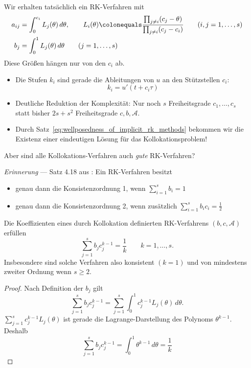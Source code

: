 Wir erhalten tatsächlich ein RK-Verfahren mit
\begin{align*}
	a_{ij} &= \int_0^{c_i} L_j(\theta) \, d \theta, \qquad L_i(\theta) \colonequals \frac{\prod_{j\neq i}(c_j-\theta)}{\prod_{j\neq i}(c_j-c_i)} \tag{$i,j = 1,\dots, s$} \\
	b_j &= \int_0^1 L_j (\theta) \, d\theta \tag{$j = 1,\dots, s$}
\end{align*}
Diese Größen hängen nur von den $c_i$ ab.
\begin{itemize}
	\item Die Stufen $k_i$ sind gerade die Ableitungen von $u$ an den Stützstellen $c_i$:
	\begin{equation*}
		k_i = u'(t+c_i\tau) \tag{$i=1,\hdots,s$}
	\end{equation*}
	\item Deutliche Reduktion der Komplexität: Nur noch $s$ Freiheitsgrade $c_1, \dots, c_s$ statt bisher $2s + s^2$ Freiheitsgrade $c,b, \mathcal A$.
	\item Durch Satz~\ref{eq:wellposedness_of_implicit_rk_methods} bekommen wir die Existenz einer eindeutigen Lösung für das Kollokationsproblem!
\end{itemize}

Aber sind alle Kollokations-Verfahren auch \textit{gute} RK-Verfahren?

\emph{Erinnerung} --- Satz 4.18 aus \cite{deuflhard_bornemann:2008}: Ein RK-Verfahren besitzt
\begin{itemize}
	\item genau dann die Konsistenzordnung 1, wenn $\sum_{i=1}^s b_i = 1$
	\item genau dann die Konsistenzordnung 2, wenn zusätzlich $\sum_{i=1}^s b_ic_i = \frac{1}{2}$
\end{itemize}

\begin{lemma}
	Die Koeffizienten eines durch Kollokation definierten RK-Verfahrens $(b,c,\mathcal{A})$ erfüllen
	\begin{equation}\label{Gleichung:Lemma DdBo 6.73}
		\sum_{j=1}^s b_jc_j^{k-1} = \frac{1}{k}\qquad k=1,\hdots,s.
	\end{equation}
	Insbesondere sind solche Verfahren also konsistent $(k=1)$ und von mindestens zweiter Ordnung wenn $s\geq2$.
\end{lemma}
\begin{proof}
	 Nach Definition der $b_j$ gilt
	\begin{equation*}
		\sum_{j=1}^s b_jc_j^{k-1} = \sum_{j=1}^s\int_0^1 c_j^{k-1}L_j(\theta)\,d\theta.
	\end{equation*}
	$\sum_{j=1}^sc_j^{k-1}L_j(\theta)$ ist gerade die Lagrange-Darstellung des Polynoms $\theta^{k-1}$. Deshalb
	\begin{equation*}
		\sum_{j=1}^s b_jc_j^{k-1} = \int_0^1\theta^{k-1}\,d\theta = \frac{1}{k}
	\end{equation*}
\end{proof}

